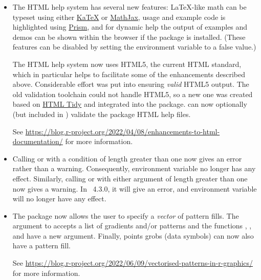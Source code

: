 \begin{itemize}

 \item{} The HTML help system has several new features: \LaTeX{}-like
  math can be typeset using either \href{https://katex.org/}{KaTeX} or
  \href{https://www.mathjax.org/}{MathJax}, usage and example code is
  highlighted using \href{https://prismjs.com}{Prism}, and for dynamic
  help the output of examples and demos can be shown within the browser
  if the  package is installed.  (These features can be
  disabled by setting the environment variable
   to a false value.)

  The HTML help system now uses HTML5, the current HTML standard, which
  in particular helps to facilitate some of the enhancements described
  above.  Considerable effort was put into ensuring
  \emph{valid} HTML5 output.  The old validation toolchain could not handle
  HTML5, so a new one was created based on
  \href{https://www.html-tidy.org/}{HTML Tidy} and integrated into
  the  package.   can now optionally (but included in
  ) validate the package HTML help files.

  See
  \url{https://blog.r-project.org/2022/04/08/enhancements-to-html-documentation/}
  for more information.

 \item{} Calling  or  with a condition of
  length greater than one now gives an error rather than a warning.
  Consequently, environment variable
   no longer has any effect.
  Similarly, calling \code{\&\&} or \code{||} with either argument of
  length greater than one now gives a warning.  In \R~4.3.0, it will
  give an error, and environment variable
   will no longer have any effect.

 \item{} The  package now allows the user to specify a
  \emph{vector} of pattern fills.  The  argument to
   accepts a list of gradients and/or patterns and the
  functions , , and
   have a new  argument.  Finally, points
  grobs (data symbols) can now also have a pattern fill.

  See
  \url{https://blog.r-project.org/2022/06/09/vectorised-patterns-in-r-graphics/}
  for more information.


\end{itemize}
